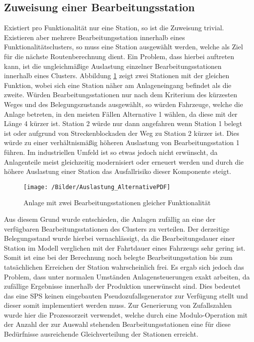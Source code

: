 		\subsection{Zuweisung einer Bearbeitungsstation}
			\label{Zuweisung_Station}
			Existiert pro Funktionalität nur eine Station, so ist die Zuweisung trivial. Existieren aber mehrere Bearbeitungsstation innerhalb eines Funktionalitätsclusters, so muss eine Station ausgewählt werden, welche als Ziel für die nächste Routenberechnung dient. Ein Problem, dass hierbei auftreten kann, ist die ungleichmäßige Auslastung einzelner Bearbeitungsstationen innerhalb eines Clusters. Abbildung \ref{Alternativen} zeigt zwei Stationen mit der gleichen Funktion, wobei sich eine Station näher am Anlageneingang befindet als die zweite. Würden Bearbeitungsstationen nur nach dem Kriterium des kürzesten Weges und des Belegungszustands ausgewählt, so würden Fahrzeuge, welche die Anlage betreten, in den meisten Fällen Alternative 1 wählen, da diese mit der Länge 4 kürzer ist. Station 2 würde nur dann angefahren wenn Station 1 belegt ist oder aufgrund von Streckenblockaden der Weg zu Station 2 kürzer ist. Dies würde zu einer verhältnismäßig höheren Auslastung von Bearbeitungsstation 1 führen. Im industriellen Umfeld ist so etwas jedoch nicht erwünscht, da Anlagenteile meist gleichzeitig modernisiert oder erneuert werden und durch die höhere Auslastung einer Station das Ausfallrisiko dieser Komponente steigt.
			
			\begin{figure}[h]
				\centering
				\texttt{[image: /Bilder/Auslastung\_AlternativePDF]}
				
				\vspace{0.2cm}
				\caption{Anlage mit zwei Bearbeitungsstationen gleicher Funktionalität}\label{Alternativen}
			\end{figure}
			
		
			Aus diesem Grund wurde entschieden, die Anlagen zufällig an eine der verfügbaren Bearbeitungsstationen des Clusters zu verteilen. Der derzeitige Belegungsstand wurde hierbei vernachlässigt, da die Bearbeitungsdauer einer Station im Modell verglichen mit der Fahrtdauer eines Fahrzeugs sehr gering ist. Somit ist eine bei der Berechnung noch belegte Bearbeitungsstation bis zum tatsächlichen Erreichen der Station wahrscheinlich frei.  Es ergab sich jedoch das Problem, dass unter normalen Umständen Anlagensteuerungen exakt arbeiten, da zufällige Ergebnisse innerhalb der Produktion unerwünscht sind. Dies bedeutet das eine \ac{SPS} keinen eingebauten Pseudozufallsgenerator zur Verfügung stellt und dieser somit implementiert werden muss. Zur Generierung von Zufallszahlen wurde hier die Prozessorzeit verwendet, welche durch eine Modulo-Operation mit der Anzahl der zur Auswahl stehenden Bearbeitungsstationen eine für diese Bedürfnisse ausreichende Gleichverteilung der Stationen erreicht.
		
